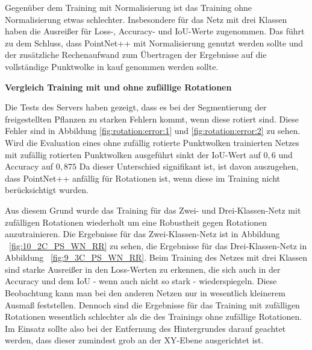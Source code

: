 \documentclass[12pt,titlepage, twoside]{article}
\begin{document}
Gegenüber dem Training mit Normalisierung ist das Training ohne Normalisierung etwas schlechter. Insbesondere für das Netz mit drei Klassen haben die Ausreißer für Loss-, Accuracy- und IoU-Werte zugenommen.
Das führt zu dem Schluss, dass PointNet++ mit Normalisierung genutzt werden sollte und der zusätzliche Rechenaufwand zum Übertragen der Ergebnisse auf die vollständige Punktwolke in kauf genommen werden sollte.

\textbf{Vergleich Training mit und ohne zufällige Rotationen}

Die Tests des Servers haben gezeigt, dass es bei der Segmentierung der freigestellten Pflanzen zu starken Fehlern kommt, wenn diese rotiert sind. 
Diese Fehler sind in Abbildung \ref{fig:rotation:error:1} und \ref{fig:rotation:error:2} zu sehen.
Wird die Evaluation eines ohne zufällig rotierte Punktwolken trainierten Netzes mit zufällig rotierten Punktwolken ausgeführt sinkt der IoU-Wert auf $0,6$ und Accuracy auf $0,875$
Da dieser Unterschied signifikant ist, ist davon auszugehen, dass PointNet++ anfällig für Rotationen ist, wenn diese im Training nicht berücksichtigt wurden.

Aus diesem Grund wurde das Training für das Zwei- und Drei-Klassen-Netz mit zufälligen Rotationen wiederholt um eine Robustheit gegen Rotationen anzutrainieren.
Die Ergebnisse für das Zwei-Klassen-Netz ist in Abbildung ~\ref{fig:10_2C_PS_WN_RR} zu sehen, die Ergebnisse für das Drei-Klassen-Netz in Abbildung ~\ref{fig:9_3C_PS_WN_RR}. 
Beim Training des Netzes mit drei Klassen sind starke Ausreißer in den Loss-Werten zu erkennen, die sich auch in der Accuracy und dem IoU - wenn auch nicht so stark - wiederspiegeln.
Diese Beobachtung kann man bei den anderen Netzen nur in wesentlich kleinerem Ausmaß feststellen. 
Dennoch sind die Ergebnisse für das Training mit zufälligen Rotationen wesentlich schlechter als die des Trainings ohne zufällige Rotationen.
Im Einsatz sollte also bei der Entfernung des Hintergrundes darauf geachtet werden, dass dieser zumindest grob an der XY-Ebene ausgerichtet ist.
\end{document}
